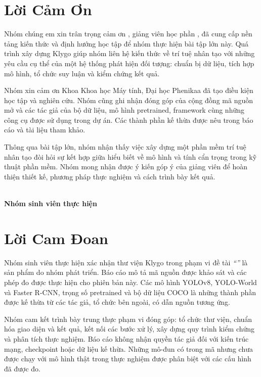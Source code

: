 \chapter*{Lời Cảm Ơn}
Nhóm chúng em xin trân trọng cảm ơn \textbf{\giangVien}, giảng viên học phần \textit{\tenMonHoc}, đã cung cấp nền tảng kiến thức và định hướng học tập để nhóm thực hiện bài tập lớn này. Quá trình xây dựng Klygo giúp nhóm liên hệ kiến thức về trí tuệ nhân tạo với những yêu cầu cụ thể của một hệ thống phát hiện đối tượng: chuẩn bị dữ liệu, tích hợp mô hình, tổ chức suy luận và kiểm chứng kết quả.

Nhóm xin cảm ơn Khoa Khoa học Máy tính, Đại học Phenikaa đã tạo điều kiện học tập và nghiên cứu. Nhóm cũng ghi nhận đóng góp của cộng đồng mã nguồn mở và các tác giả của bộ dữ liệu, mô hình pretrained, framework cùng những công cụ được sử dụng trong dự án. Các thành phần kế thừa được nêu trong báo cáo và tài liệu tham khảo.

Thông qua bài tập lớn, nhóm nhận thấy việc xây dựng một phần mềm trí tuệ nhân tạo đòi hỏi sự kết hợp giữa hiểu biết về mô hình và tính cẩn trọng trong kỹ thuật phần mềm. Nhóm mong nhận được ý kiến góp ý của giảng viên để hoàn thiện thiết kế, phương pháp thực nghiệm và cách trình bày kết quả.
\begin{flushright}\textit{\ngayBaoCao}\\[0.5cm]\textbf{Nhóm sinh viên thực hiện}\end{flushright}
\clearpage

\chapter*{Lời Cam Đoan}
Nhóm sinh viên thực hiện xác nhận thư viện Klygo trong phạm vi đề tài \textit{``\tenDeTai''} là sản phẩm do nhóm phát triển. Báo cáo mô tả mã nguồn được khảo sát và các phép đo được thực hiện cho phiên bản này. Các mô hình YOLOv8, YOLO-World và Faster R-CNN, trọng số pretrained và bộ dữ liệu COCO là những thành phần được kế thừa từ các tác giả, tổ chức bên ngoài, có dẫn nguồn tương ứng.

Nhóm cam kết trình bày trung thực phạm vi đóng góp: tổ chức thư viện, chuẩn hóa giao diện và kết quả, kết nối các bước xử lý, xây dựng quy trình kiểm chứng và phân tích thực nghiệm. Báo cáo không nhận quyền tác giả đối với kiến trúc mạng, checkpoint hoặc dữ liệu kế thừa. Những mô-đun có trong mã nhưng chưa được chạy với mô hình thật trong thực nghiệm được phân biệt với các cấu hình đã được đo.

